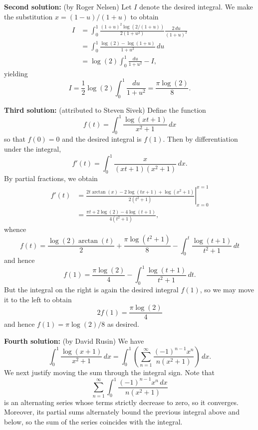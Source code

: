 \documentclass[amssymb,twocolumn,pra,10pt,aps]{revtex4-1}
\begin{document}
\begin{itemize}
\textbf{Second solution:}
(by Roger Nelsen)
Let $I$ denote the desired integral. We make the substitution
$x = (1-u)/(1+u)$ to obtain
\begin{align*}
I &= \int_0^1 \frac{(1+u)^2\log(2/(1+u))}{2(1+u^2)} \frac{2\,du}{(1+u)^2} \\
&= \int_0^1 \frac{\log(2) - \log(1+u)}{1+u^2}\,du \\
&= \log(2) \int_0^1 \frac{du}{1+u^2} - I,
\end{align*}
yielding
\[
I = \frac{1}{2} \log(2) \int_0^1 \frac{du}{1+u^2} = \frac{\pi \log(2)}{8}.
\]

\textbf{Third solution:}
(attributed to Steven Sivek)
Define the function
\[
f(t) = \int_0^1 \frac{\log(xt+1)}{x^2+1}\,dx
\]
so that $f(0) = 0$ and
the desired integral is $f(1)$. Then by differentiation under
the integral,
\[
f'(t) = \int_0^1 \frac{x}{(xt+1)(x^2+1)}\,dx.
\]
By partial fractions, we obtain
\begin{align*}
f'(t) &= \left. \frac{2 t \arctan(x) - 2 \log(tx+1) + \log(x^2+1)}{2(t^2+1)}
\right|_{x=0}^{x=1}
\\ &= \frac{\pi t + 2 \log(2) - 4 \log(t+1)}{4(t^2+1)},
\end{align*}
whence
\[
f(t) = \frac{\log(2) \arctan(t)}{2} + \frac{\pi \log(t^2+1)}{8}
- \int_0^t \frac{\log(t+1)}{t^2+1}\,dt
\]
and hence
\[
f(1) = \frac{\pi \log(2)}{4} - \int_0^1 \frac{\log(t+1)}{t^2+1}\,dt.
\]
But the integral on the right is again the desired integral $f(1)$, so
we may move it to the left to obtain
\[
2f(1) = \frac{\pi \log(2)}{4}
\]
and hence $f(1) = \pi \log(2)/8$ as desired.

\textbf{Fourth solution:} (by David Rusin)
We have
\[
\int_0^1 \frac{\log(x+1)}{x^2+1}\,dx =
\int_0^1 \left( \sum_{n=1}^\infty \frac{(-1)^{n-1} x^n}{n(x^2+1)} \right)\,dx.
\]
We next justify moving the sum  through the integral sign.
Note that
\[
\sum_{n=1}^\infty \int_0^1 \frac{(-1)^{n-1} x^n\,dx}{n(x^2+1)}
\]
is an alternating series whose terms strictly decrease to zero, so it
converges. Moreover, its partial sums alternately bound the previous
integral above and below, so the sum of the series coincides with the integral.


\end{itemize}
\end{document}
